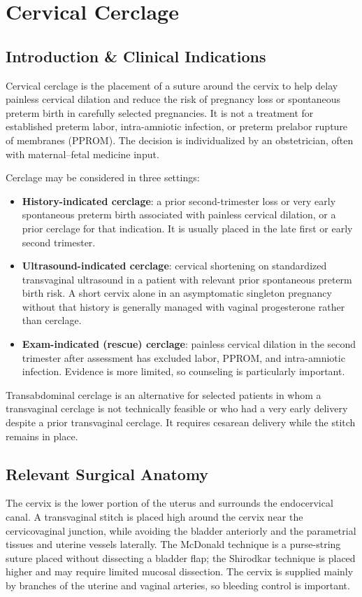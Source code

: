 \chapter{Cervical Cerclage}

\section*{Introduction \& Clinical Indications}
Cervical cerclage is the placement of a suture around the cervix to help delay painless cervical dilation and reduce the risk of pregnancy loss or spontaneous preterm birth in carefully selected pregnancies. It is not a treatment for established preterm labor, intra-amniotic infection, or preterm prelabor rupture of membranes (PPROM). The decision is individualized by an obstetrician, often with maternal--fetal medicine input.

Cerclage may be considered in three settings:
\begin{itemize}
  \item \textbf{History-indicated cerclage}: a prior second-trimester loss or very early spontaneous preterm birth associated with painless cervical dilation, or a prior cerclage for that indication. It is usually placed in the late first or early second trimester.
  \item \textbf{Ultrasound-indicated cerclage}: cervical shortening on standardized transvaginal ultrasound in a patient with relevant prior spontaneous preterm birth risk. A short cervix alone in an asymptomatic singleton pregnancy without that history is generally managed with vaginal progesterone rather than cerclage.
  \item \textbf{Exam-indicated (rescue) cerclage}: painless cervical dilation in the second trimester after assessment has excluded labor, PPROM, and intra-amniotic infection. Evidence is more limited, so counseling is particularly important.
\end{itemize}

Transabdominal cerclage is an alternative for selected patients in whom a transvaginal cerclage is not technically feasible or who had a very early delivery despite a prior transvaginal cerclage. It requires cesarean delivery while the stitch remains in place.

\section*{Relevant Surgical Anatomy}
The cervix is the lower portion of the uterus and surrounds the endocervical canal. A transvaginal stitch is placed high around the cervix near the cervicovaginal junction, while avoiding the bladder anteriorly and the parametrial tissues and uterine vessels laterally. The McDonald technique is a purse-string suture placed without dissecting a bladder flap; the Shirodkar technique is placed higher and may require limited mucosal dissection. The cervix is supplied mainly by branches of the uterine and vaginal arteries, so bleeding control is important.

